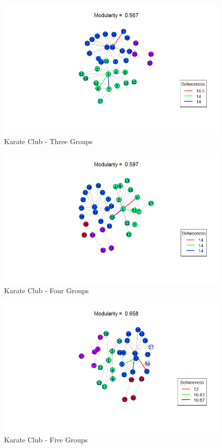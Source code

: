\documentclass[letterpaper,11pt]{report}
\begin{document}
\begin{savenotes}
\begin{figure}[htbp]
	\centering
		\includegraphics[width=1.00\textwidth]{karateClubThreeGroups.png}
	\caption{Karate Club - Three Groups}
	\label{fig:karateClubThreeGroups}
\end{figure}

\begin{figure}[htbp]
	\centering
		\includegraphics[width=1.00\textwidth]{karateClubFourGroups.png}
	\caption{Karate Club - Four Groups}
	\label{fig:karateClubFourGroups}
\end{figure}

\begin{figure}[htbp]
	\centering
		\includegraphics[width=1.00\textwidth]{karateClubFiveGroups.png}
	\caption{Karate Club - Five Groups}
	\label{fig:karateClubFiveGroups}
\end{figure}


\end{savenotes}
\end{document}
